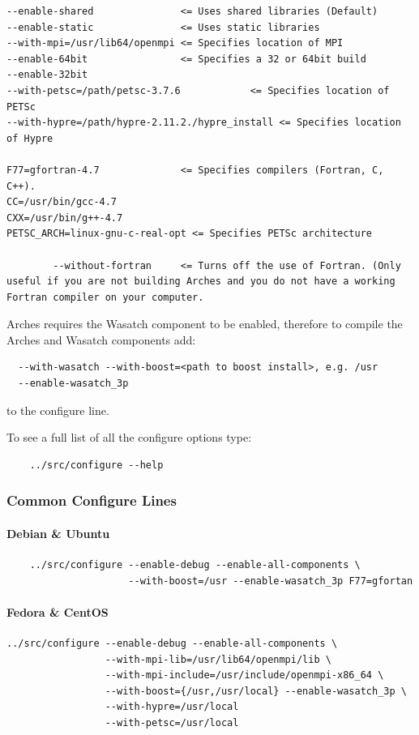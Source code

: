 \documentclass[12pt]{article}
\begin{document}
\begin{verbatim}
--enable-shared               <= Uses shared libraries (Default)
--enable-static               <= Uses static libraries 
--with-mpi=/usr/lib64/openmpi <= Specifies location of MPI
--enable-64bit                <= Specifies a 32 or 64bit build
--enable-32bit
--with-petsc=/path/petsc-3.7.6            <= Specifies location of PETSc
--with-hypre=/path/hypre-2.11.2./hypre_install <= Specifies location of Hypre

F77=gfortran-4.7              <= Specifies compilers (Fortran, C, C++).
CC=/usr/bin/gcc-4.7
CXX=/usr/bin/g++-4.7
PETSC_ARCH=linux-gnu-c-real-opt <= Specifies PETSc architecture

        --without-fortran     <= Turns off the use of Fortran. (Only
useful if you are not building Arches and you do not have a working
Fortran compiler on your computer. 

\end{verbatim}

Arches requires the Wasatch component to be enabled, therefore to
compile the Arches and Wasatch components add:
\begin{verbatim}
  --with-wasatch --with-boost=<path to boost install>, e.g. /usr
  --enable-wasatch_3p
\end{verbatim}
to the configure line.

To see a full list of all the configure options type:

\begin{verbatim}
    ../src/configure --help
\end{verbatim}

\subsubsection{Common Configure Lines}

\paragraph{Debian \& Ubuntu}
\begin{verbatim}
    ../src/configure --enable-debug --enable-all-components \
                     --with-boost=/usr --enable-wasatch_3p F77=gfortan
\end{verbatim}


\paragraph{Fedora \& CentOS}
\begin{verbatim}
../src/configure --enable-debug --enable-all-components \
                 --with-mpi-lib=/usr/lib64/openmpi/lib \
                 --with-mpi-include=/usr/include/openmpi-x86_64 \
                 --with-boost={/usr,/usr/local} --enable-wasatch_3p \
                 --with-hypre=/usr/local 
                 --with-petsc=/usr/local
\end{verbatim}
\end{document}

